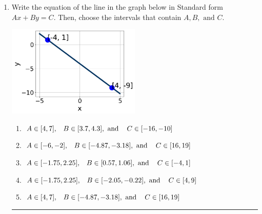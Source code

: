 \documentclass[14pt]{extbook}
\newcommand{\litem}[1]{\item#1\hspace*{-1cm}\rule{\textwidth}{0.4pt}}
\begin{document}
\begin{enumerate}
{\begin{enumerate}[label=\Alph*.]
\end{enumerate} }
\litem{
Write the equation of the line in the graph below in Standard form $Ax+By=C$. Then, choose the intervals that contain $A, B, \text{ and } C$.
\begin{center}
    \includegraphics[width=0.5\textwidth]{../Figures/linearGraphToStandardCopyC.png}
\end{center}
\begin{enumerate}[label=\Alph*.]
\item \( A \in [4, 7], \hspace{3mm} B \in [3.7, 4.3], \text{ and } \hspace{3mm} C \in [-16, -10] \)
\item \( A \in [-6, -2], \hspace{3mm} B \in [-4.87, -3.18], \text{ and } \hspace{3mm} C \in [16, 19] \)
\item \( A \in [-1.75, 2.25], \hspace{3mm} B \in [0.57, 1.06], \text{ and } \hspace{3mm} C \in [-4, 1] \)
\item \( A \in [-1.75, 2.25], \hspace{3mm} B \in [-2.05, -0.22], \text{ and } \hspace{3mm} C \in [4, 9] \)
\item \( A \in [4, 7], \hspace{3mm} B \in [-4.87, -3.18], \text{ and } \hspace{3mm} C \in [16, 19] \)


\end{enumerate}}
\end{enumerate}
\end{document}
